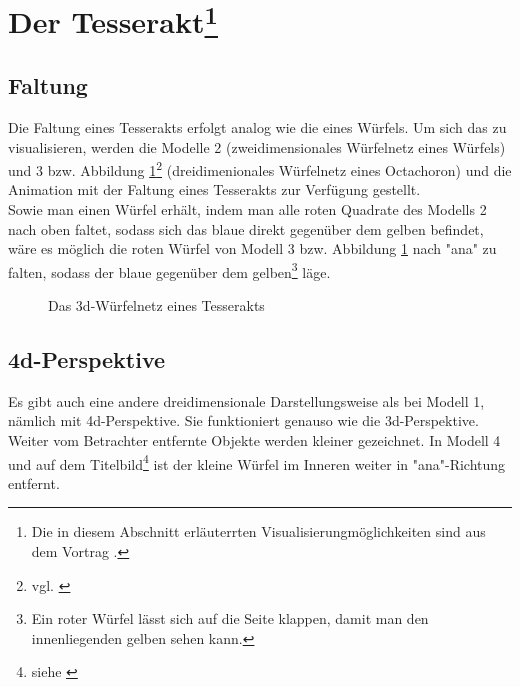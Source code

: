 \newpage
\section[Tesserakt]{Der Tesserakt\footnote{Die in diesem Abschnitt erläuterrten Visualisierungmöglichkeiten sind aus dem Vortrag \cite{Matt}.}}
	\subsection*{Faltung}
		 Die Faltung eines Tesserakts erfolgt analog wie die eines Würfels. Um sich das zu visualisieren, werden die Modelle 2 (zweidimensionales Würfelnetz eines Würfels) und 3 bzw. Abbildung \ref{Tesserakt}\footnote{vgl. \cite{Wuerfelnetz}} (dreidimenionales Würfelnetz eines Octachoron) und die Animation mit der Faltung eines Tesserakts zur Verfügung gestellt.
		 \\ \indent Sowie man einen Würfel erhält, indem man alle roten Quadrate des Modells 2 nach oben faltet, sodass sich das blaue direkt gegenüber dem gelben befindet, wäre es möglich die roten Würfel von Modell 3 bzw. Abbildung \ref{Tesserakt} nach "ana" zu falten, sodass der blaue gegenüber dem gelben\footnote{Ein roter Würfel lässt sich auf die Seite klappen, damit man den innenliegenden gelben sehen kann.} läge. 

\begin{figure}[h]
\centering

\caption[lala]{Das 3d-Würfelnetz eines Tesserakts}
\label{Tesserakt}
\end{figure} 
		 
	\subsection*{4d-Perspektive}
Es gibt auch eine andere dreidimensionale Darstellungsweise als bei Modell 1, nämlich mit 4d-Perspektive. Sie funktioniert genauso wie die 3d-Perspektive. Weiter vom Betrachter entfernte Objekte werden kleiner gezeichnet. In Modell 4 und auf dem Titelbild\footnote{siehe \cite{Titelbild}} ist der kleine Würfel im Inneren weiter in "ana"-Richtung entfernt. 


